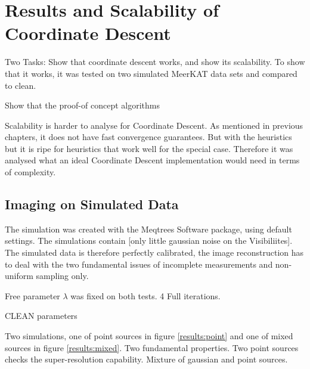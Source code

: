 \section{Results and Scalability of Coordinate Descent}
Two Tasks: Show that coordinate descent works, and show its scalability. To show that it works, it was tested on two simulated MeerKAT data sets and compared to clean.

Show that the proof-of concept algorithms 

Scalability is harder to analyse for Coordinate Descent. As mentioned in previous chapters, it does not have fast convergence guarantees. But with the heuristics  but it is ripe for heuristics that work well for the special case. Therefore it was analysed what an ideal Coordinate Descent implementation would need in terms of complexity.



\subsection{Imaging on Simulated Data}
The simulation was created with the Meqtrees Software package, using default settings. The simulations contain [only little gaussian noise on the Visibiliites]. The simulated data is therefore perfectly calibrated, the image reconstruction has to deal with the two fundamental issues of incomplete measurements and non-uniform sampling only.

Free parameter $\lambda$ was fixed on both tests. 4 Full iterations.

CLEAN parameters

Two simulations, one of point sources in figure \ref{results:point} and one of mixed sources in figure \ref{results:mixed}. Two fundamental properties. Two point sources checks the super-resolution capability. Mixture of gaussian and point sources. 

